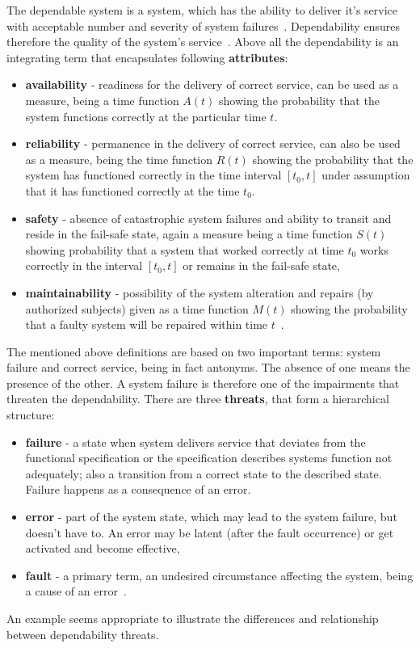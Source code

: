 The dependable system is a system, which has the ability to deliver it's service with acceptable number and severity of system failures~\cite{art:Avizienis}. Dependability ensures therefore the quality of the system's service~\cite{art:Laprie}. Above all the dependability is an integrating term that encapsulates following \textbf{attributes}:
\begin{itemize}
\item \textbf{availability} - readiness for the delivery of correct service, can be used as a  measure, being a time function $A(t)$ showing the probability that the system functions correctly at the particular time $t$. 
\item \textbf{reliability} - permanence in the delivery of correct service, can also be used as a measure, being the time function $R(t)$ showing the probability that the system has functioned correctly in the time interval $[t_0,t]$ under assumption that it has functioned correctly at the time $t_0$.
\item \textbf{safety} - absence of catastrophic system failures and ability to transit and reside in the fail-safe state, again a measure being a time function $S(t)$ showing probability that a system that worked correctly at time $t_0$ works correctly in the interval $[t_0,t]$ or remains in the fail-safe state,
\item \textbf{maintainability} - possibility of the system alteration and repairs (by authorized subjects) given as a time function $M(t)$ showing the probability that a faulty system will be repaired within time $t$~\cite{art:Laprie, art:Avizienis, art:Avizienis2}.
\end{itemize}
The mentioned above definitions are based on two important terms: system failure and correct service, being in fact antonyms. The absence of one means the presence of the other. A system failure is therefore one of the impairments that threaten the dependability. There are three \textbf{threats}, that form a hierarchical structure:
\begin{itemize}
    \item \textbf{failure} - a state when system delivers service that deviates from the functional specification or the specification describes systems function not adequately; also a transition from a correct state to the described state. Failure happens as a consequence of an error.
    \item \textbf{error} - part of the system state, which may lead to the system failure, but doesn't have to. An error may be latent (after the fault occurrence) or get activated and become effective,
    \item \textbf{fault} - a primary term, an undesired circumstance affecting the system, being a cause of an error~\cite{art:Avizienis, art:Avizienis2}. 
\end{itemize}
An example seems appropriate to illustrate the differences and relationship between dependability threats. 

